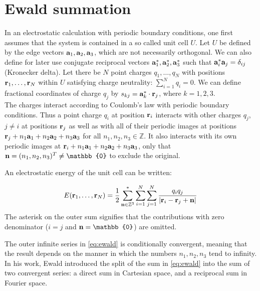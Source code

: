 \documentclass[12pt,a4paper]{report}
\begin{document}
\section{Ewald summation} \label{sec_ewald}
In an electrostatic calculation with periodic boundary conditions, one first assumes that the system is contained in a so called unit cell $U$. Let $U$ be defined by the edge vectors $\bold{a}_1, \bold{a}_2, \bold{a}_3$, which are not necessarily orthogonal. We can also define for later use conjugate reciprocal vectors $\bold{a}_1^*, \bold{a}_2^*, \bold{a}_3^*$ such that $\bold{a}_i^* \bold{a}_j = \delta_{ij}$ (Kronecker delta).
 Let there be $N$ point charges $q_1, \dotsc, q_N$ with positions $\bold{r}_1, \dotsc, \bold{r}_N$ within $U$ satisfying charge neutrality:  $\sum\limits_{i=1}^N q_i=0$. We can define fractional coordinates of charge $q_j$ by $s_{kj} = \bold{a}_k^* \cdot \bold{r}_j$, where $k = 1, 2, 3$. 
\\
The charges interact according to Coulomb’s law with periodic boundary conditions. Thus a point charge $q_i$ at position $\bold{r}_i$ interacts with
other charges $q_j$, $j \neq i$ at positions $\bold{r}_j$ as well as with all of
their periodic images at positions $\bold{r}_j + n_1 \bold{a}_1  + n_2 \bold{a}_2  + n_3 \bold{a}_3$ for
all $n_1, n_2 , n_3 \in \mathbb{Z}$. It also interacts with its own periodic
images at $\bold{r}_i + n_1 \bold{a}_1  + n_2 \bold{a}_2  + n_3 \bold{a}_3$, only that  $\bold{n} = (n_1, n_2, n_3)^T \neq \mathbb{0}$ to exclude the original. 

An electrostatic energy of the unit cell can be written:

\begin{equation} \label{eq:ewald}
E(\bold{r}_1, \dotsc, \bold{r}_N) = \frac{1}{2} \sum\limits_{\bold{n} \in \mathbb{Z}^3}^* \sum_{i=1}^N \sum\limits_{j=1}^N \frac{q_i q_j}{\lvert\bold{r}_i - \bold{r}_j + \bold{n} \rvert}
\end{equation}
The asterisk on the outer sum signifies that the contributions with zero denominator ($i =j$ and $\bold{n} = \mathbb{0}$) are omitted.

The outer infinite series in \eqref{eq:ewald} is conditionally convergent, meaning that the result depends on the manner in which the numbers $n_1, n_2, n_3$ tend to infinity.
In his work, Ewald \cite{ewald} introduced the split of the sum in \eqref{eq:ewald} into the sum of two convergent series: a direct sum in Cartesian space, and a
reciprocal sum in Fourier space. 
\end{document}
